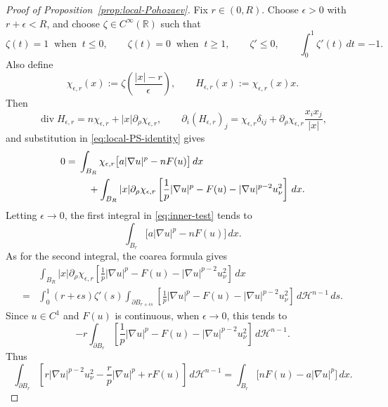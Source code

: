 \documentclass[reqno,12pt]{amsart}
\numberwithin{equation}{section}
\theoremstyle{remark}
\newcommand{\dd}{\,d}
\begin{document}
\begin{proof}[Proof of Proposition~\ref{prop:local-Pohozaev}]
Fix $r\in(0,R)$.  Choose $\epsilon>0$ with $r+\epsilon<R$, and choose $\zeta\in C^\infty(\mathbb R)$ such that
$$
\zeta(t)=1\ \text{ when } \ t\le 0,\qquad
\zeta(t)=0\ \text{ when } \ t\ge 1,\qquad \zeta'\le 0,
\qquad \int_0^1\zeta'(t)\dd t=-1.
$$
Also define
$$
\chi_{\epsilon,r}(x) :=\zeta\left(\frac{|x|-r}{\epsilon}\right),\qquad H_{\epsilon,r}(x):=\chi_{\epsilon,r}(x)x.
$$
Then
$$
\operatorname{div}H_{\epsilon,r}
=n\chi_{\epsilon,r}+|x|\partial_\rho\chi_{\epsilon,r},
\qquad \partial_i(H_{\epsilon,r})_j
=\chi_{\epsilon,r}\delta_{ij}
+\partial_\rho\chi_{\epsilon,r}\frac{x_ix_j}{|x|},
$$
and substitution in \eqref{eq:local-PS-identity} gives
\begin{align}
0={}&
\int_{B_R}\chi_{\epsilon,r}
\bigl[a|\nabla u|^p-nF(u)\bigr]\dd x \notag \\
&\quad +\int_{B_R}|x|\partial_\rho\chi_{\epsilon,r}
\left[ \frac1p|\nabla u|^p-F(u) -|\nabla u|^{p-2}u_\nu^2 \right]\dd x. \label{eq:inner-test}
\end{align}
Letting  $\epsilon\to 0$,
the first integral in \eqref{eq:inner-test} tends to
$$
\int_{B_r}\bigl[a|\nabla u|^p-nF(u)\bigr]\dd x. 
$$
As for the second integral, the coarea formula gives
\begin{align*}
&\int_{B_R}|x|\partial_\rho\chi_{\epsilon,r}
\left[\frac1p|\nabla u|^p-F(u)
-|\nabla u|^{p-2}u_\nu^2 \right]\dd x\\
=&\int_0^1(r+\epsilon s)\zeta'(s)
\int_{\partial B_{r+\epsilon s}}
\left[\frac1p|\nabla u|^p-F(u)-|\nabla u|^{p-2}u_\nu^2 \right]\dd \mathcal H^{n-1}\dd s.
\end{align*}
Since $u\in C^1$ and $F(u)$ is continuous, when $\epsilon\to 0$, this tends to
$$
-r\int_{\partial B_r}\left[\frac1p|\nabla u|^p-F(u)
-|\nabla u|^{p-2}u_\nu^2\right]\dd \mathcal H^{n-1}.
$$
Thus
\begin{equation}\label{eq:pohozaev-boundary-first}
 \int_{\partial B_r}
\left[ r|\nabla u|^{p-2}u_\nu^2-\frac rp|\nabla u|^p+rF(u)
\right]\dd \mathcal H^{n-1} = \int_{B_r}\bigl[nF(u)-a|\nabla u|^p\bigr]\dd x.
\end{equation}


\end{proof}
\end{document}

